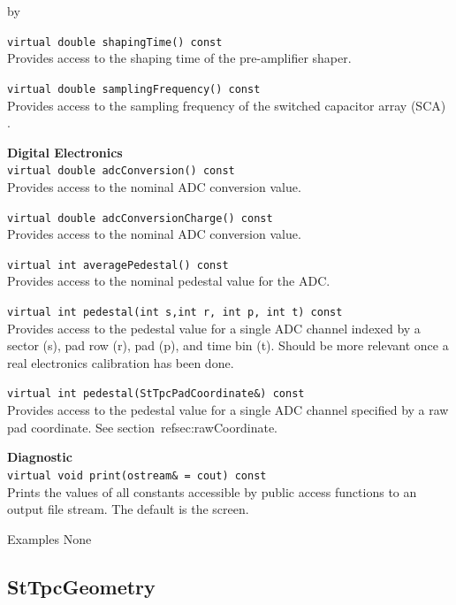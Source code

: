 \documentclass[twoside]{article}
\newcommand{\entrylabel}[1]{\mbox{\textbf{{#1}}}\hfil}%
\newenvironment{entry}
{\begin{list}{}%
    {\renewcommand{\makelabel}{\entrylabel}%
     \setlength{\labelwidth}{90pt}%
     \setlength{\leftmargin}{\labelwidth}
     \advance\leftmargin by \labelsep%
      }%
    }%
  {\end{list}}
\newcommand{\Entrylabel}[1]%
{\raisebox{0pt}[1ex][0pt]{\makebox[\labelwidth][l]%
    {\parbox[t]{\labelwidth}{\hspace{0pt}\textbf{{#1}}}}}}
\newenvironment{Entry}%
{\renewcommand{\entrylabel}{\Entrylabel}\begin{entry}}%
  {\end{entry}}
\begin{document}
\begin{Entry}
  \verb+virtual double shapingTime() const+\\
  Provides access to the shaping time of the pre-amplifier shaper.

  \verb+virtual double samplingFrequency() const+\\
  Provides access to the sampling frequency of the switched capacitor 
  array (SCA) .

  {\bf Digital Electronics \\}
  \verb+virtual double adcConversion() const+\\
  Provides access to the nominal ADC conversion value.

  \verb+virtual double adcConversionCharge() const+\\
  Provides access to the nominal ADC conversion value.

  \verb+virtual int averagePedestal() const+\\
  Provides access to the nominal pedestal value for the ADC.

  \verb+virtual int pedestal(int s,int r, int p, int t) const+\\
  Provides access to the pedestal value for a single ADC channel indexed
  by a sector (s), pad row (r), pad (p), and time bin (t).  Should
  be more relevant once a real electronics calibration has been done.

  \verb+virtual int pedestal(StTpcPadCoordinate&) const+\\
  Provides access to the pedestal value for a single ADC channel specified
  by a raw pad coordinate.  See section~ref{sec:rawCoordinate}.

  {\bf Diagnostic\\} 
  \verb+virtual void print(ostream& = cout) const+\\
  Prints the values of all constants accessible by public access
  functions to an output file stream.  The default is the screen.

\item[Examples]
  None

\end{Entry}
\clearpage

%
%
\subsection{StTpcGeometry }
\label{sec:stTpcGeometry}
\end{document}
